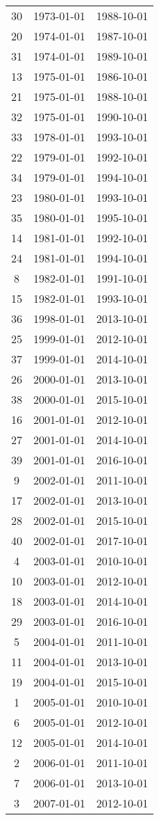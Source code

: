 % 
\begin{tabular}{ccc}
  \hline
  \hline
30 & 1973-01-01 & 1988-10-01 \\ 
  20 & 1974-01-01 & 1987-10-01 \\ 
  31 & 1974-01-01 & 1989-10-01 \\ 
  13 & 1975-01-01 & 1986-10-01 \\ 
  21 & 1975-01-01 & 1988-10-01 \\ 
  32 & 1975-01-01 & 1990-10-01 \\ 
  33 & 1978-01-01 & 1993-10-01 \\ 
  22 & 1979-01-01 & 1992-10-01 \\ 
  34 & 1979-01-01 & 1994-10-01 \\ 
  23 & 1980-01-01 & 1993-10-01 \\ 
  35 & 1980-01-01 & 1995-10-01 \\ 
  14 & 1981-01-01 & 1992-10-01 \\ 
  24 & 1981-01-01 & 1994-10-01 \\ 
  8 & 1982-01-01 & 1991-10-01 \\ 
  15 & 1982-01-01 & 1993-10-01 \\ 
  36 & 1998-01-01 & 2013-10-01 \\ 
  25 & 1999-01-01 & 2012-10-01 \\ 
  37 & 1999-01-01 & 2014-10-01 \\ 
  26 & 2000-01-01 & 2013-10-01 \\ 
  38 & 2000-01-01 & 2015-10-01 \\ 
  16 & 2001-01-01 & 2012-10-01 \\ 
  27 & 2001-01-01 & 2014-10-01 \\ 
  39 & 2001-01-01 & 2016-10-01 \\ 
  9 & 2002-01-01 & 2011-10-01 \\ 
  17 & 2002-01-01 & 2013-10-01 \\ 
  28 & 2002-01-01 & 2015-10-01 \\ 
  40 & 2002-01-01 & 2017-10-01 \\ 
  4 & 2003-01-01 & 2010-10-01 \\ 
  10 & 2003-01-01 & 2012-10-01 \\ 
  18 & 2003-01-01 & 2014-10-01 \\ 
  29 & 2003-01-01 & 2016-10-01 \\ 
  5 & 2004-01-01 & 2011-10-01 \\ 
  11 & 2004-01-01 & 2013-10-01 \\ 
  19 & 2004-01-01 & 2015-10-01 \\ 
  1 & 2005-01-01 & 2010-10-01 \\ 
  6 & 2005-01-01 & 2012-10-01 \\ 
  12 & 2005-01-01 & 2014-10-01 \\ 
  2 & 2006-01-01 & 2011-10-01 \\ 
  7 & 2006-01-01 & 2013-10-01 \\ 
  3 & 2007-01-01 & 2012-10-01 \\ 
   \hline
\end{tabular}
